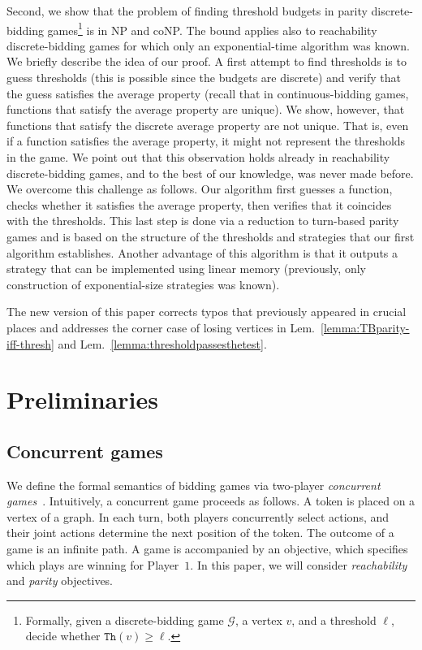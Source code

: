 \documentclass{article}\providecommand{\nequiv}{\not\equiv}\usepackage[a4paper,margin=20mm]{geometry}
\newcommand{\PO}{Player~$1$\xspace}
\newcommand{\G}{{\mathcal G}}
\newcommand{\thresh}{\texttt{Th}\xspace}
\begin{document}
Second, we show that the problem of finding threshold budgets in parity discrete-bidding games\footnote{Formally, given a discrete-bidding game $\G$, a vertex $v$, and a threshold $\ell$, decide whether $\thresh(v) \geq \ell$.} 
is in NP and coNP. The bound applies also to reachability discrete-bidding games for which only an exponential-time algorithm was known. 
We briefly describe the idea of our proof. A first attempt to find thresholds is to guess thresholds (this is possible since the budgets are discrete) and verify that the guess satisfies the average property (recall that in continuous-bidding games, functions that satisfy the average property are unique). 
We show, however, that functions that satisfy the discrete average property are not unique. That is, even if a function satisfies the average property, it might not represent the thresholds in the game. We point out that this observation holds already in reachability discrete-bidding games, and to the best of our knowledge, was never made before. 
We overcome this challenge as follows. Our algorithm first guesses a function, checks whether it satisfies the average property, then verifies that it coincides with the thresholds. This last step is done via a reduction to turn-based parity games and is based on the structure of the thresholds and strategies that our first algorithm establishes. 
Another advantage of this algorithm is that it outputs a strategy that can be implemented using linear memory (previously, only construction of exponential-size strategies was known).

The new version of this paper corrects typos that previously appeared in crucial places and addresses the corner case of losing vertices in Lem.~\ref{lemma:TBparity-iff-thresh} and Lem.~\ref{lemma:thresholdpassesthetest}. 




















\section{Preliminaries}

\subsection{Concurrent games}
We define the formal semantics of bidding games via two-player {\em concurrent games}~\cite{AHK02}. Intuitively, a concurrent game proceeds as follows. A token is placed on a vertex of a graph. In each turn, both players concurrently select actions, and their joint actions determine the next position of the token. The outcome of a game is an infinite path. A game is accompanied by an objective, which specifies which plays are winning for \PO. 
In this paper, we will consider {\em reachability} and {\em parity} objectives. 
\end{document}
